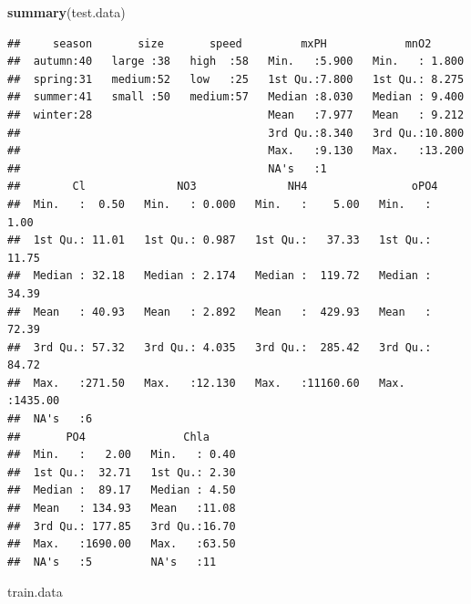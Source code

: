 \documentclass[]{report}
\newenvironment{Shaded}{\begin{snugshade}}{\end{snugshade}}
\newcommand{\KeywordTok}[1]{\textcolor[rgb]{0.13,0.29,0.53}{\textbf{#1}}}
\newcommand{\NormalTok}[1]{#1}
\begin{document}
\begin{Shaded}
\begin{Highlighting}[]
\KeywordTok{summary}\NormalTok{(test.data)}
\end{Highlighting}
\end{Shaded}

\begin{verbatim}
##     season       size       speed         mxPH            mnO2       
##  autumn:40   large :38   high  :58   Min.   :5.900   Min.   : 1.800  
##  spring:31   medium:52   low   :25   1st Qu.:7.800   1st Qu.: 8.275  
##  summer:41   small :50   medium:57   Median :8.030   Median : 9.400  
##  winter:28                           Mean   :7.977   Mean   : 9.212  
##                                      3rd Qu.:8.340   3rd Qu.:10.800  
##                                      Max.   :9.130   Max.   :13.200  
##                                      NA's   :1                       
##        Cl              NO3              NH4                oPO4        
##  Min.   :  0.50   Min.   : 0.000   Min.   :    5.00   Min.   :   1.00  
##  1st Qu.: 11.01   1st Qu.: 0.987   1st Qu.:   37.33   1st Qu.:  11.75  
##  Median : 32.18   Median : 2.174   Median :  119.72   Median :  34.39  
##  Mean   : 40.93   Mean   : 2.892   Mean   :  429.93   Mean   :  72.39  
##  3rd Qu.: 57.32   3rd Qu.: 4.035   3rd Qu.:  285.42   3rd Qu.:  84.72  
##  Max.   :271.50   Max.   :12.130   Max.   :11160.60   Max.   :1435.00  
##  NA's   :6                                                             
##       PO4               Chla      
##  Min.   :   2.00   Min.   : 0.40  
##  1st Qu.:  32.71   1st Qu.: 2.30  
##  Median :  89.17   Median : 4.50  
##  Mean   : 134.93   Mean   :11.08  
##  3rd Qu.: 177.85   3rd Qu.:16.70  
##  Max.   :1690.00   Max.   :63.50  
##  NA's   :5         NA's   :11
\end{verbatim}

\begin{Shaded}
\begin{Highlighting}[]
\NormalTok{train.data}
\end{Highlighting}
\end{Shaded}
\end{document}
